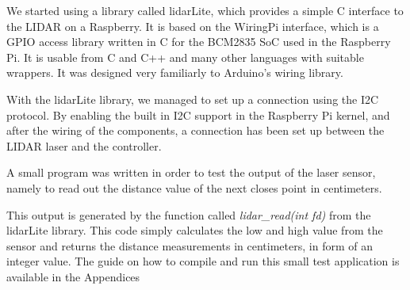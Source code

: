 We started using a library called lidarLite, which provides a simple C interface to the LIDAR on a Raspberry. It is based on the WiringPi interface, which is a GPIO access library written in C for the BCM2835 SoC used in the Raspberry Pi. It is usable from C and C++ and many other languages with suitable wrappers. It was designed very familiarly to Arduino's wiring library.

With the lidarLite library, we managed to set up a connection using the I2C protocol. By enabling the built in I2C support in the Raspberry Pi kernel, and after the wiring of the components, a connection has been set up between the LIDAR laser and the controller.


A small program was written in order to test the output of the laser sensor, namely to read out the distance value of the next closes point in centimeters. 


This output is generated by the function called \textit{lidar\_read(int fd)} from the lidarLite library. This code simply calculates the low and high value from the sensor and returns the distance measurements in centimeters, in form of an integer value. The guide on how to compile and run this small test application is available in the Appendices \\ %

